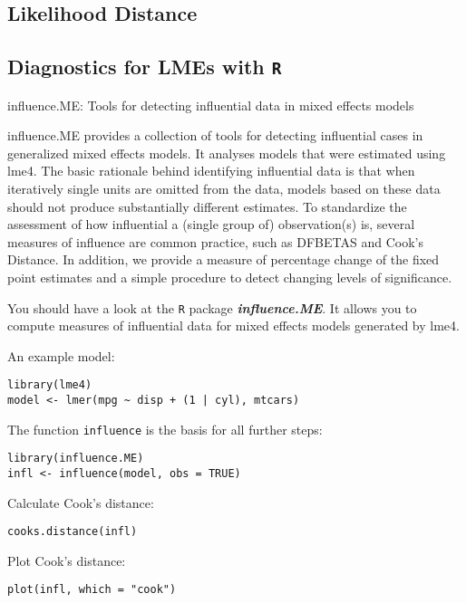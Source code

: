 



\subsection{Likelihood Distance}


\citet{BA83}

\subsection{Diagnostics for LMEs with \texttt{R}}
influence.ME: Tools for detecting influential data in mixed effects models

influence.ME provides a collection of tools for detecting influential cases in generalized mixed effects models. It analyses models that were estimated using lme4. The basic rationale behind identifying influential data is that when iteratively single units are omitted from the data, models based on these data should not produce substantially different estimates. To standardize the assessment of how influential a (single group of) observation(s) is, several measures of influence are common practice, such as DFBETAS and Cook's Distance. In addition, we provide a measure of percentage change of the fixed point estimates and a simple procedure to detect changing levels of significance.



You should have a look at the \texttt{R} package \textit{\textbf{influence.ME}}. It allows you to compute measures of influential data for mixed effects models generated by lme4.

An example model:
\begin{verbatim}
library(lme4)
model <- lmer(mpg ~ disp + (1 | cyl), mtcars)
\end{verbatim}

The function \texttt{influence} is the basis for all further steps:

\begin{verbatim}
library(influence.ME)
infl <- influence(model, obs = TRUE)
\end{verbatim}
Calculate Cook's distance:
\begin{verbatim}
cooks.distance(infl)
\end{verbatim}
Plot Cook's distance:
\begin{verbatim}
plot(infl, which = "cook")
\end{verbatim}
\newpage


